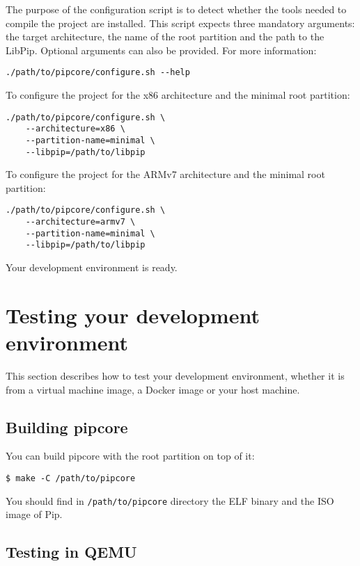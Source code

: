 \documentclass[10pt,a4paper,titlepage]{refart}
\begin{document}
The purpose of the configuration script is to detect whether the tools needed to
compile the project are installed. This script expects three mandatory
arguments: the target architecture, the name of the root partition and the path
to the LibPip. Optional arguments can also be provided. For more information:

\begin{lstlisting}[style=BashStyle]
./path/to/pipcore/configure.sh --help
\end{lstlisting}

To configure the project for the x86 architecture and the minimal root
partition:

\begin{lstlisting}[style=BashStyle]
./path/to/pipcore/configure.sh \
    --architecture=x86 \
    --partition-name=minimal \
    --libpip=/path/to/libpip
\end{lstlisting}

To configure the project for the ARMv7 architecture and the minimal root
partition:

\begin{lstlisting}[style=BashStyle]
./path/to/pipcore/configure.sh \
    --architecture=armv7 \
    --partition-name=minimal \
    --libpip=/path/to/libpip
\end{lstlisting}

Your development environment is ready.

\section{Testing your development environment}

This section describes how to test your development environment, whether it is
from a virtual machine image, a Docker image or your host machine.

\subsection{Building pipcore}

You can build pipcore with the root partition on top of it:

\begin{lstlisting}[style=BashStyle]
    $ make -C /path/to/pipcore
\end{lstlisting}

You should find in \texttt{/path/to/pipcore} directory the ELF binary and the
ISO image of Pip.

\subsection{Testing in QEMU}
\end{document}
